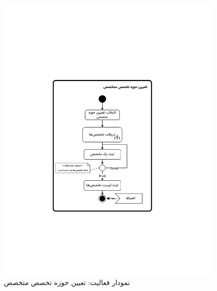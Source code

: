 \begin{figure}[ht!]
	\centering
	\includegraphics[scale=0.8, page=1]{figs/OOD-activity21-30.pdf}
	\caption{نمودار فعالیت: تعیین حوزه تخصص متخصص}
\end{figure}
\FloatBarrier
\newpage

